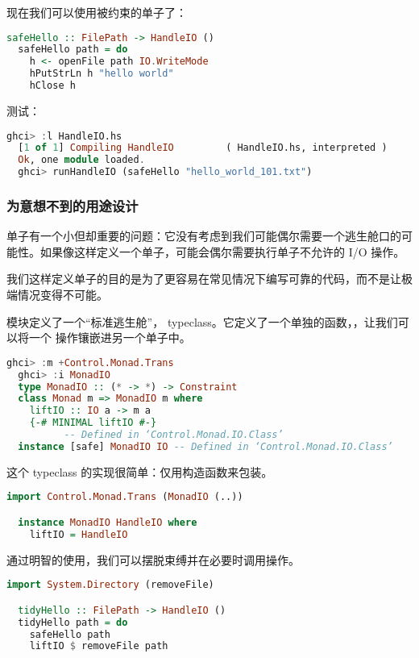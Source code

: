 \documentclass[./main.tex]{subfiles}
\begin{document}
现在我们可以使用被约束的单子了：

\begin{lstlisting}[language=Haskell]
  safeHello :: FilePath -> HandleIO ()
  safeHello path = do
    h <- openFile path IO.WriteMode
    hPutStrLn h "hello world"
    hClose h
\end{lstlisting}

测试：

\begin{lstlisting}[language=Haskell]
  ghci> :l HandleIO.hs
  [1 of 1] Compiling HandleIO         ( HandleIO.hs, interpreted )
  Ok, one module loaded.
  ghci> runHandleIO (safeHello "hello_world_101.txt")
\end{lstlisting}

\subsubsection*{为意想不到的用途设计}

单子有一个小但却重要的问题：它没有考虑到我们可能偶尔需要一个逃生舱口的可能性。如果像这样定义一个单子，可能会偶尔需要执行单子不允许的 I/O 操作。

我们这样定义单子的目的是为了更容易在常见情况下编写可靠的代码，而不是让极端情况变得不可能。

模块定义了一个“标准逃生舱”， typeclass。它定义了一个单独的函数，，让我们可以将一个
操作镶嵌进另一个单子中。

\begin{lstlisting}[language=Haskell]
  ghci> :m +Control.Monad.Trans
  ghci> :i MonadIO
  type MonadIO :: (* -> *) -> Constraint
  class Monad m => MonadIO m where
    liftIO :: IO a -> m a
    {-# MINIMAL liftIO #-}
          -- Defined in ‘Control.Monad.IO.Class’
  instance [safe] MonadIO IO -- Defined in ‘Control.Monad.IO.Class’
\end{lstlisting}

这个 typeclass 的实现很简单：仅用构造函数来包装。

\begin{lstlisting}[language=Haskell]
  import Control.Monad.Trans (MonadIO (..))

  instance MonadIO HandleIO where
    liftIO = HandleIO
\end{lstlisting}

通过明智的使用，我们可以摆脱束缚并在必要时调用操作。

\begin{lstlisting}[language=Haskell]
  import System.Directory (removeFile)

  tidyHello :: FilePath -> HandleIO ()
  tidyHello path = do
    safeHello path
    liftIO $ removeFile path
\end{lstlisting}
\end{document}
